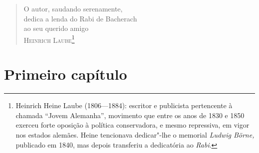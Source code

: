 


\vspace*{4cm}
\begin{verse}
O autor, saudando serenamente,\\
dedica a lenda do Rabi de Bacherach\\
ao seu querido amigo\\
\textsc{Heinrich Laube}\footnote{
Heinrich Heine Laube (1806---1884): escritor e publicista pertencente à
chamada ``Jovem Alemanha'', movimento que entre os anos de 1830 e 1850
exerceu forte oposição à política conservadora, e mesmo repressiva, em
vigor nos estados alemães. Heine tencionava dedicar"-lhe o memorial
\textit{Ludwig Börne, }publicado em 1840, mas depois transferiu a
dedicatória ao \textit{Rabi}.}

\end{verse}

\chapter[Primeiro capítulo]{Primeiro capítulo}


\vspace{2.5cm}

